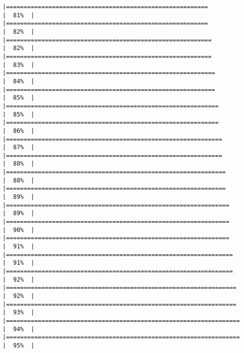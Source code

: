 \documentclass[
]{book}
\begin{document}
\begin{verbatim}
|=========================================================             |  81%  |                                                                              |=========================================================             |  82%  |                                                                              |==========================================================            |  82%  |                                                                              |==========================================================            |  83%  |                                                                              |===========================================================           |  84%  |                                                                              |===========================================================           |  85%  |                                                                              |============================================================          |  85%  |                                                                              |============================================================          |  86%  |                                                                              |=============================================================         |  87%  |                                                                              |=============================================================         |  88%  |                                                                              |==============================================================        |  88%  |                                                                              |==============================================================        |  89%  |                                                                              |===============================================================       |  89%  |                                                                              |===============================================================       |  90%  |                                                                              |===============================================================       |  91%  |                                                                              |================================================================      |  91%  |                                                                              |================================================================      |  92%  |                                                                              |=================================================================     |  92%  |                                                                              |=================================================================     |  93%  |                                                                              |==================================================================    |  94%  |                                                                              |==================================================================    |  95%  |                                                                              
\end{verbatim}
\end{document}
